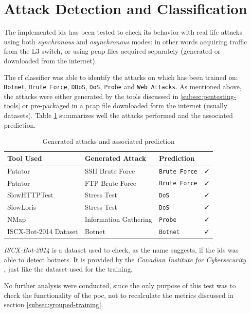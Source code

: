 \section{Attack Detection and Classification}
\label{sec:attack-detection}

The implemented \gls{ids} has been tested to check its behavior with real life attacks using both \textit{synchronous} and \textit{asynchronous} modes: in other words acquiring traffic from the L3 switch, or using \gls{pcap} files acquired separately (generated or downloaded from the internet).
\par The \gls{rf} classifier was able to identify the attacks on which has been trained on: \texttt{Botnet}, \texttt{Brute Force}, \texttt{DDoS}, \texttt{DoS}, \texttt{Probe} and \texttt{Web Attacks}. As mentioned above, the attacks were either generated by the tools discussed in \ref{subsec:pentesting-tools} or pre-packaged in a \gls{pcap} file downloaded form the internet (usually datasets). Table \ref{tab:attack-predictions} summarizes well the attacks performed and the associated prediction.

\begin{table}[h!]
   \centering
   \begin{tabular}{l|lll}
       \toprule 
       Tool Used & Generated Attack & Prediction & \\
       \midrule
       \rowcolor{black!10} Patator & SSH Brute Force & \texttt{Brute Force} & \faCheck \\
       Patator & FTP Brute Force & \texttt{Brute Force} & \faCheck \\
       \rowcolor{black!10} SlowHTTPTest & Stress Test & \texttt{DoS} & \faCheck \\
       SlowLoris & Stress Test & \texttt{DoS} & \faCheck \\
       \rowcolor{black!10} NMap & Information Gathering & \texttt{Probe} & \faCheck \\
       ISCX-Bot-2014 Dataset & Botnet & \texttt{Botnet} & \faCheck \\
       \bottomrule
   \end{tabular}
   \caption{Generated attacks and associated prediction}
   \label{tab:attack-predictions}
\end{table}
\textit{ISCX-Bot-2014} is a dataset used to check, as the name suggests, if the \gls{ids} was able to detect botnets. It is provided by the \textit{Canadian Institute for Cybersecurity} \cite{Beigi2014}, just like the dataset used for the training.
\par No further analysis were conducted, since the only purpose of this test was to check the functionality of the \gls{poc}, not to recalculate the metrics discussed in section \ref{subsec:grouped-training}.